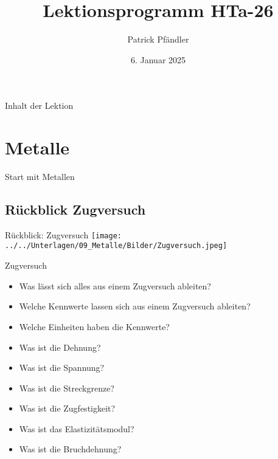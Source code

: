 





\title{\textbf{Lektionsprogramm HTa-26}}
\author{Patrick Pfändler}
\date{6. Januar 2025}




\frame{\titlepage}

\begin{frame}{Inhalt der Lektion}
	\tableofcontents
\end{frame}


\section{Metalle}
\BlueSectionSlide
\begin{frame}{Start mit Metallen}
\end{frame}

\subsection{Rückblick Zugversuch}
\begin{frame}{Rückblick: Zugversuch}
	\centering
	\texttt{[image: ../../Unterlagen/09\_Metalle/Bilder/Zugversuch.jpeg]}
\end{frame}


\begin{frame}{Zugversuch}
	\begin{Fragenblock}
		\begin{itemize}
			\item Was lässt sich alles aus einem Zugversuch ableiten?
			\item Welche Kennwerte lassen sich aus einem Zugversuch ableiten?
			\item Welche Einheiten haben die Kennwerte?
			\item Was ist die Dehnung?
			\item Was ist die Spannung?
			\item Was ist die Streckgrenze?
			\item Was ist die Zugfestigkeit?
			\item Was ist das Elastizitätsmodul?
			\item Was ist die Bruchdehnung?
		\end{itemize}
	\end{Fragenblock}
\end{frame}





